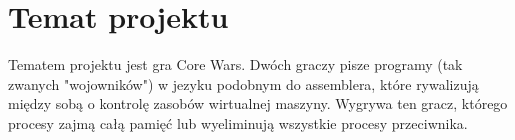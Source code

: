 \chapter{Temat projektu}
Tematem projektu jest gra Core Wars. Dwóch graczy pisze programy (tak zwanych "wojowników") w jezyku podobnym do assemblera, które rywalizują między sobą o kontrolę zasobów wirtualnej maszyny. Wygrywa ten gracz, którego procesy zajmą całą pamięć lub wyeliminują wszystkie procesy przeciwnika.